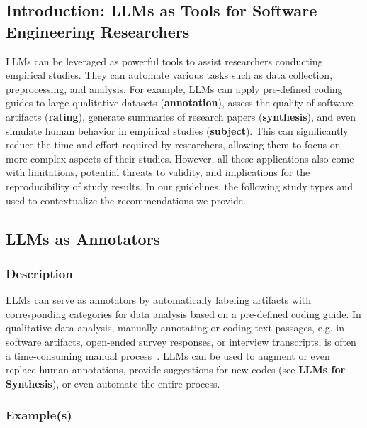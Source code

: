 \documentclass[11pt]{article}
\begin{document}
\subsection{Introduction: LLMs as Tools for Software Engineering Researchers}

LLMs can be leveraged as powerful tools to assist researchers conducting empirical studies.
They can automate various tasks such as data collection, preprocessing, and analysis.
For example, LLMs can apply pre-defined coding guides to large qualitative datasets (\textbf{annotation}), assess the quality of software artifacts (\textbf{rating}), generate summaries of research papers (\textbf{synthesis}), and even simulate human behavior in empirical studies (\textbf{subject}).
This can significantly reduce the time and effort required by researchers, allowing them to focus on more complex aspects of their studies.
However, all these applications also come with limitations, potential threats to validity, and implications for the reproducibility of study results.
In our guidelines, the following study types and used to contextualize the recommendations we provide.


\subsection{LLMs as Annotators}

\subsubsection{Description}

LLMs can serve as annotators by automatically labeling artifacts with corresponding categories for data analysis based on a pre-defined coding guide.
In qualitative data analysis, manually annotating or coding text passages, e.g. in software artifacts, open-ended survey responses, or interview transcripts, is often a time-consuming manual process~\cite{DBLP:journals/ase/BanoHZT24}.
LLMs can be used to augment or even replace human annotations, provide suggestions for new codes (see \textbf{LLMs for Synthesis}), or even automate the entire process.

\subsubsection{Example(s)}
\end{document}
